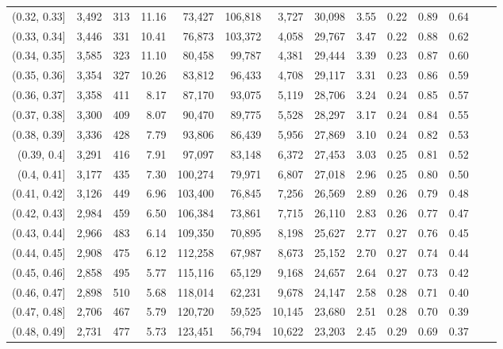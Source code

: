 \begin{tabular}{rrrrrrrrrrrrrr}
(0.32, 0.33]   &  3,492 &  313 &   11.16 &   73,427 &  106,818 &   3,727 &  30,098 &  3.55 &  0.22 &  0.89 &      0.64 \\
(0.33, 0.34]   &  3,446 &  331 &   10.41 &   76,873 &  103,372 &   4,058 &  29,767 &  3.47 &  0.22 &  0.88 &      0.62 \\
(0.34, 0.35]   &  3,585 &  323 &   11.10 &   80,458 &   99,787 &   4,381 &  29,444 &  3.39 &  0.23 &  0.87 &      0.60 \\
(0.35, 0.36]   &  3,354 &  327 &   10.26 &   83,812 &   96,433 &   4,708 &  29,117 &  3.31 &  0.23 &  0.86 &      0.59 \\
(0.36, 0.37]   &  3,358 &  411 &    8.17 &   87,170 &   93,075 &   5,119 &  28,706 &  3.24 &  0.24 &  0.85 &      0.57 \\
(0.37, 0.38]   &  3,300 &  409 &    8.07 &   90,470 &   89,775 &   5,528 &  28,297 &  3.17 &  0.24 &  0.84 &      0.55 \\
(0.38, 0.39]   &  3,336 &  428 &    7.79 &   93,806 &   86,439 &   5,956 &  27,869 &  3.10 &  0.24 &  0.82 &      0.53 \\
(0.39, 0.4]    &  3,291 &  416 &    7.91 &   97,097 &   83,148 &   6,372 &  27,453 &  3.03 &  0.25 &  0.81 &      0.52 \\
(0.4, 0.41]    &  3,177 &  435 &    7.30 &  100,274 &   79,971 &   6,807 &  27,018 &  2.96 &  0.25 &  0.80 &      0.50 \\
(0.41, 0.42]   &  3,126 &  449 &    6.96 &  103,400 &   76,845 &   7,256 &  26,569 &  2.89 &  0.26 &  0.79 &      0.48 \\
(0.42, 0.43]   &  2,984 &  459 &    6.50 &  106,384 &   73,861 &   7,715 &  26,110 &  2.83 &  0.26 &  0.77 &      0.47 \\
(0.43, 0.44]   &  2,966 &  483 &    6.14 &  109,350 &   70,895 &   8,198 &  25,627 &  2.77 &  0.27 &  0.76 &      0.45 \\
(0.44, 0.45]   &  2,908 &  475 &    6.12 &  112,258 &   67,987 &   8,673 &  25,152 &  2.70 &  0.27 &  0.74 &      0.44 \\
(0.45, 0.46]   &  2,858 &  495 &    5.77 &  115,116 &   65,129 &   9,168 &  24,657 &  2.64 &  0.27 &  0.73 &      0.42 \\
(0.46, 0.47]   &  2,898 &  510 &    5.68 &  118,014 &   62,231 &   9,678 &  24,147 &  2.58 &  0.28 &  0.71 &      0.40 \\
(0.47, 0.48]   &  2,706 &  467 &    5.79 &  120,720 &   59,525 &  10,145 &  23,680 &  2.51 &  0.28 &  0.70 &      0.39 \\
(0.48, 0.49]   &  2,731 &  477 &    5.73 &  123,451 &   56,794 &  10,622 &  23,203 &  2.45 &  0.29 &  0.69 &      0.37 \\

\end{tabular}
